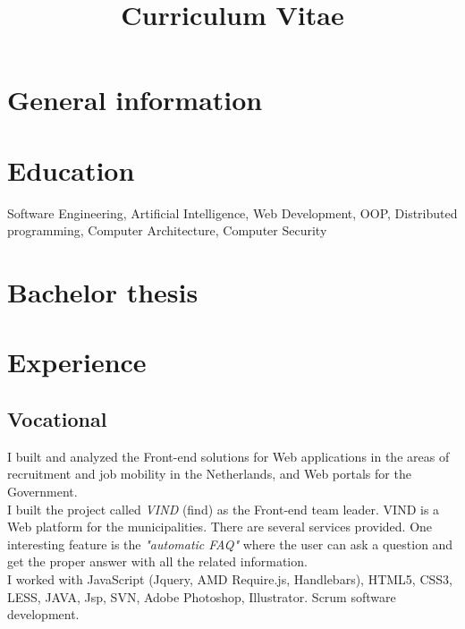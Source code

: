 \documentclass[11pt,a4paper]{moderncv-mod}
\title{Curriculum Vitae}               %
\begin{document}
\maketitle

\section{General information}

\section{Education}
{Software Engineering, Artificial Intelligence, Web Development, OOP, Distributed programming, Computer Architecture, Computer Security}  %
\newline


\section{Bachelor thesis}

\section{Experience}
\subsection{Vocational}

{I built and analyzed the Front-end solutions for Web applications in the areas of recruitment and job mobility in the Netherlands, and Web portals for the Government.\\
I built the project called \emph{VIND} (find) as the Front-end team leader. VIND is a Web platform for the municipalities. There are several services provided. One interesting feature is the \emph{"automatic FAQ"} where the user can ask a question and get the proper answer with all the related information.\\ 
I worked with JavaScript (Jquery, AMD Require.js, Handlebars), HTML5, CSS3, LESS, JAVA, Jsp, SVN, Adobe Photoshop, Illustrator. Scrum software development.
}
\end{document}
